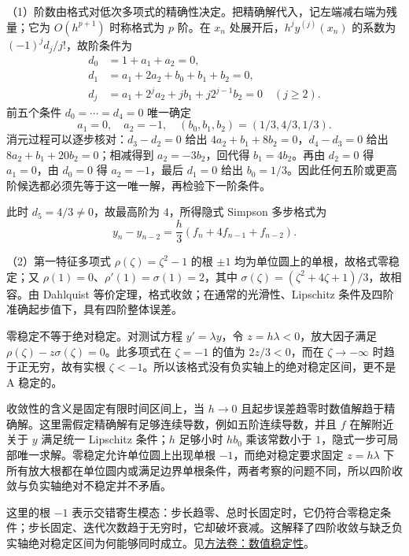 \documentclass[12pt,fontset=fandol]{ctexart}
\begin{document}
\begin{solve}\label{ans:fin12-high:13}

（1）阶数由格式对低次多项式的精确性决定。把精确解代入，记左端减右端为残量；它为 $O(h^{p+1})$ 时称格式为 $p$ 阶。在 $x_n$ 处展开后，$h^jy^{(j)}(x_n)$ 的系数为 $(-1)^jd_j/j!$，故阶条件为
\[
\begin{aligned}
d_0&=1+a_1+a_2=0,\\
d_1&=a_1+2a_2+b_0+b_1+b_2=0,\\
d_j&=a_1+2^ja_2+jb_1+j2^{j-1}b_2=0\quad(j\geq2).
\end{aligned}
\]
前五个条件 $d_0=\cdots=d_4=0$ 唯一确定
\[
a_1=0,\quad a_2=-1,\quad(b_0,b_1,b_2)=(1/3,4/3,1/3).
\]
消元过程可以逐步核对：$d_3-d_2=0$ 给出 $4a_2+b_1+8b_2=0$，$d_4-d_3=0$ 给出 $8a_2+b_1+20b_2=0$；相减得到 $a_2=-3b_2$，回代得 $b_1=4b_2$。再由 $d_2=0$ 得 $a_1=0$，由 $d_0=0$ 得 $a_2=-1$，最后 $d_1=0$ 给出 $b_0=1/3$。因此任何五阶或更高阶候选都必须先等于这一唯一解，再检验下一阶条件。

此时 $d_5=4/3\ne0$，故最高阶为 $4$，所得隐式 Simpson 多步格式为
\[
y_n-y_{n-2}=\frac h3(f_n+4f_{n-1}+f_{n-2}).
\]

（2）第一特征多项式 $\rho(\zeta)=\zeta^2-1$ 的根 $\pm1$ 均为单位圆上的单根，故格式零稳定；又 $\rho(1)=0$、$\rho'(1)=\sigma(1)=2$，其中 $\sigma(\zeta)=(\zeta^2+4\zeta+1)/3$，故相容。由 Dahlquist 等价定理，格式收敛；在通常的光滑性、Lipschitz 条件及四阶准确起步值下，具有四阶整体误差。

零稳定不等于绝对稳定。对测试方程 $y'=\lambda y$，令 $z=h\lambda<0$，放大因子满足 $\rho(\zeta)-z\sigma(\zeta)=0$。此多项式在 $\zeta=-1$ 的值为 $2z/3<0$，而在 $\zeta\to-\infty$ 时趋于正无穷，故有实根 $\zeta<-1$。所以该格式没有负实轴上的绝对稳定区间，更不是 A 稳定的。

收敛性的含义是固定有限时间区间上，当 $h\to0$ 且起步误差趋零时数值解趋于精确解。这里需假定精确解有足够连续导数，例如五阶连续导数，并且 $f$ 在解附近关于 $y$ 满足统一 Lipschitz 条件；$h$ 足够小时 $hb_0$ 乘该常数小于 $1$，隐式一步可局部唯一求解。零稳定允许单位圆上出现单根 $-1$，而绝对稳定要求固定 $z=h\lambda$ 下所有放大根都在单位圆内或满足边界单根条件，两者考察的问题不同，所以四阶收敛与负实轴绝对不稳定并不矛盾。

\end{solve}

\begin{remark}[方法与条件]这里的根 $-1$ 表示交错寄生模态：步长趋零、总时长固定时，它仍符合零稳定条件；步长固定、迭代次数趋于无穷时，它却破坏衰减。这解释了四阶收敛与缺乏负实轴绝对稳定区间为何能够同时成立。见\hyperref[app:dynamics-stability]{方法卷：数值稳定性}。\end{remark}
\end{document}
